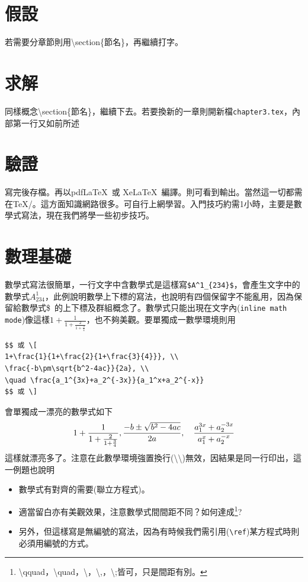 \section{假設}
若需要分章節則用{\textbackslash section\{節名\}}，再繼續打字。
\section{求解}
同樣概念{\textbackslash section\{節名\}}，繼續下去。若要換新的一章則開新檔{\tt chapter3.tex}，內部第一行又如前所述

\section{驗證}
寫完後存檔。再以pdf\LaTeX\ 或 Xe\LaTeX\ 編譯。則可看到輸出。當然這一切都需在\TeX/。這方面知識網路很多。可自行上網學習。入門技巧約需1小時，主要是數學式寫法，現在我們將學一些初步技巧。
\section{數理基礎}
數學式寫法很簡單，一行文字中含數學式是這樣寫\verb|$A^1_{234}$|，會產生文字中的數學式$A^1_{234}$，此例說明數學上下標的寫法，也說明有四個保留字不能亂用，因為保留給數學式\$\ 的上下標及群組概念了。數學式只能出現在文字內({\tt inline math mode})像這樣$1+\frac{1}{1+\frac{2}{1+\frac{3}{4}}}$，也不夠美觀。要單獨成一數學環境則用\\
\begin{Verbatim}[frame=single,firstline=1,label=Form 1 w/o number]
$$ 或 \[
1+\frac{1}{1+\frac{2}{1+\frac{3}{4}}}, \\
\frac{-b\pm\sqrt{b^2-4ac}}{2a}, \\
\quad \frac{a_1^{3x}+a_2^{-3x}}{a_1^x+a_2^{-x}}
$$ 或 \]
\end{Verbatim}
會單獨成一漂亮的數學式如下  \index{\LaTeX\ 環境!\textbackslash [}\index{\LaTeX\ 環境!\textbackslash ]}
$$ 
1+\frac{1}{1+\frac{2}{1+\frac{3}{4}}}, \\
\frac{-b\pm\sqrt{b^2-4ac}}{2a},\\
\quad \frac{a_1^{3x}+a_2^{-3x}}{a_1^x+a_2^{-x}}
$$
這樣就漂亮多了。注意在此數學環境強置換行(\textbackslash \textbackslash)無效，因結果是同一行印出，這一例題也說明
\begin{itemize}
\item 數學式有對齊的需要(聯立方程式)。
\item 適當留白亦有美觀效果，注意數學式間間距不同？如何達成\footnote{\textbackslash qquad，\textbackslash quad，\textbackslash ，\textbackslash,，\textbackslash;皆可，只是間距有別。}? 
\item 另外，但這樣寫是無編號的寫法，因為有時候我們需引用(\verb|\ref|)某方程式時則必須用編號的方式。
\end{itemize}
